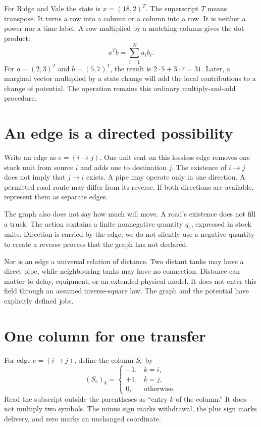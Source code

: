For Ridge and Vale the state is \(x=(18,2)^T\). The superscript \(T\) means transpose. It turns a row into a column or a column into a row. It is neither a power nor a time label. A row multiplied by a matching column gives the dot product:
\begin{equation}
 a^Tb=\sum_{i=1}^{N}a_i b_i.
\end{equation}
For \(a=(2,3)^T\) and \(b=(5,7)^T\), the result is \(2\cdot5+3\cdot7=31\). Later, a marginal vector multiplied by a state change will add the local contributions to a change of potential. The operation remains this ordinary multiply-and-add procedure.

\section{An edge is a directed possibility}
Write an edge as \(e=(i\to j)\). One unit sent on this lossless edge removes one stock unit from source \(i\) and adds one to destination \(j\). The existence of \(i\to j\) does not imply that \(j\to i\) exists. A pipe may operate only in one direction. A permitted road route may differ from its reverse. If both directions are available, represent them as separate edges.

The graph also does not say how much will move. A road's existence does not fill a truck. The action contains a finite nonnegative quantity \(q_e\), expressed in stock units. Direction is carried by the edge; we do not silently use a negative quantity to create a reverse process that the graph has not declared.

Nor is an edge a universal relation of distance. Two distant tanks may have a direct pipe, while neighbouring tanks may have no connection. Distance can matter to delay, equipment, or an extended physical model. It does not enter this field through an assumed inverse-square law. The graph and the potential have explicitly defined jobs.

\section{One column for one transfer}
For edge \(e=(i\to j)\), define the column \(S_e\) by
\begin{equation}
 (S_e)_k=\begin{cases}-1,&k=i,\\+1,&k=j,\\0,&\text{otherwise}.\end{cases}
\end{equation}
Read the subscript outside the parentheses as ``entry \(k\) of the column.'' It does not multiply two symbols. The minus sign marks withdrawal, the plus sign marks delivery, and zero marks an unchanged coordinate.

